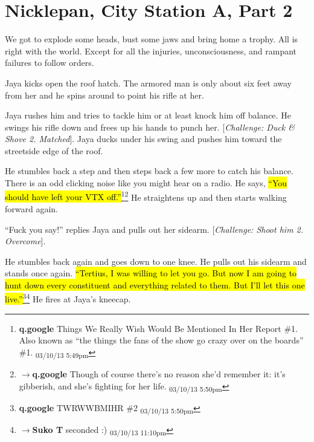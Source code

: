 \setcounter{chapter}{ 15 }
\chapter{\textbf{Nicklepan, City Station A, Part 2} }








We got to explode some heads, bust some jaws and bring home a trophy.  All is right with the world.  Except for all the injuries, unconsciousness, and rampant failures to follow orders.






Jaya kicks open the roof hatch.  The armored man is only about six feet away from her and he spins around to point his rifle at her.



Jaya rushes him and tries to tackle him or at least knock him off balance.  He swings his rifle down and frees up his hands to punch her.  {[}\textit{Challenge: Duck \& Shove 2.  Matched}{]}. Jaya ducks under his swing and pushes him toward the streetside edge of the roof.



He stumbles back a step and then steps back a few more to catch his balance.  There is  an odd clicking noise like you might hear on a radio.  He says, \hl{``You should have left your VTX off.''}\footnote{\textbf{q.google }Things We Really Wish Would Be Mentioned In Her Report \#1.
Also known as ``the things the fans of the show go crazy over on the boards'' \#1. \textsubscript{03/10/13 5:49pm}}\footnote{$\rightarrow$\textbf{q.google }Though of course there's no reason she'd remember it: it's gibberish, and she's fighting for her life. \textsubscript{03/10/13 5:50pm}}  He straightens up and then starts walking forward again.



``Fuck you say!'' replies Jaya and pulls out her sidearm.  {[}\textit{Challenge: Shoot him 2.  Overcome}{]}.  



He stumbles back again and goes down to one knee.  He pulls out his sidearm and stands once again.  \hl{``Tertius, I was willing to let you go.  But now I am going to hunt down every constituent and everything related to them.  But I'll let this one live.''}\footnote{\textbf{q.google }TWRWWBMIHR \#2 \textsubscript{03/10/13 5:50pm}}\footnote{$\rightarrow$\textbf{Suko T }seconded :) \textsubscript{03/10/13 11:10pm}}  He fires at Jaya's kneecap.


